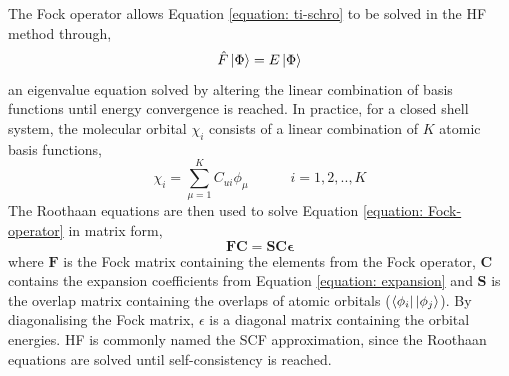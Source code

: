 The Fock operator allows Equation \ref{equation: ti-schro} to be solved in the \ac{HF} method through,
\begin{equation}\label{equation: Fock-operator}
    \hat{F}\ket{\Phi}=E\ket{\Phi}
\end{equation}
an eigenvalue equation solved by altering the linear combination of basis functions until energy convergence is reached. In practice, for a closed shell system, the molecular orbital $\chi_{i}$ consists of a linear combination of $K$ atomic basis functions,
\begin{equation}\label{equation: expansion}
    \chi_{i}=\sum_{\mu=1}^{K}C_{ui}\phi_{\mu}\qquad\quad{}i=1,2,..,K
\end{equation}
The Roothaan equations are then used to solve Equation \ref{equation: Fock-operator} in matrix form,
\begin{equation}
    \bm{FC}={\bm{SC\epsilon}}
\end{equation}
where $\bm{F}$ is the Fock matrix containing the elements from the Fock operator, $\bm{C}$ contains the expansion coefficients from Equation \ref{equation: expansion} and $\bm{S}$ is the overlap matrix containing the overlaps of atomic orbitals ($\bra{\phi_{i}}\ket{\phi_{j}}$). By diagonalising the Fock matrix, $\epsilon$ is a diagonal matrix containing the orbital energies. \ac{HF} is commonly named the \ac{SCF} approximation, since the Roothaan equations are solved until self-consistency is reached.


